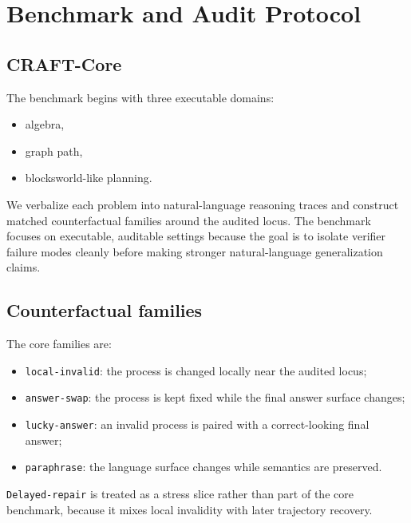 \section{Benchmark and Audit Protocol}

\subsection{CRAFT-Core}

The benchmark begins with three executable domains:
\begin{itemize}[leftmargin=1.5em]
\item algebra,
\item graph path,
\item blocksworld-like planning.
\end{itemize}
We verbalize each problem into natural-language reasoning traces and construct
matched counterfactual families around the audited locus. The benchmark focuses
on executable, auditable settings because the goal is to isolate verifier
failure modes cleanly before making stronger natural-language generalization
claims.

\subsection{Counterfactual families}

The core families are:
\begin{itemize}[leftmargin=1.5em]
\item \texttt{local-invalid}: the process is changed locally near the audited
locus;
\item \texttt{answer-swap}: the process is kept fixed while the final answer
surface changes;
\item \texttt{lucky-answer}: an invalid process is paired with a correct-looking
final answer;
\item \texttt{paraphrase}: the language surface changes while semantics are
preserved.
\end{itemize}
\texttt{Delayed-repair} is treated as a stress slice rather than part of the
core benchmark, because it mixes local invalidity with later trajectory
recovery.


